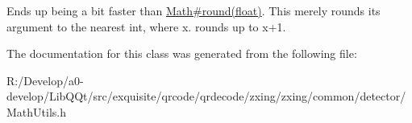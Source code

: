 Ends up being a bit faster than \mbox{\hyperlink{}{Math\#round(float)}}. This merely rounds its argument to the nearest int, where x. rounds up to x+1. 

The documentation for this class was generated from the following file\+:\begin{DoxyCompactItemize}
\item 
R\+:/\+Develop/a0-\/develop/\+Lib\+Q\+Qt/src/exquisite/qrcode/qrdecode/zxing/zxing/common/detector/Math\+Utils.\+h\end{DoxyCompactItemize}
